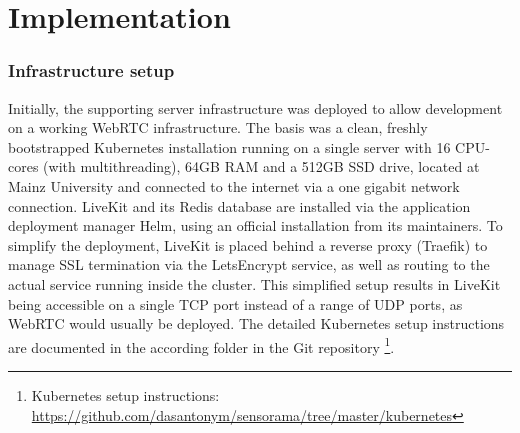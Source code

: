 \chapter{Implementation}

\subsection{Infrastructure setup}

Initially, the supporting server infrastructure was deployed to allow development on a working WebRTC infrastructure. The basis was a clean, freshly bootstrapped Kubernetes installation running on a single server with 16 CPU-cores (with multithreading), 64GB RAM and a 512GB SSD drive, located at Mainz University and connected to the internet via a one gigabit network connection. LiveKit and its Redis database are installed via the application deployment manager Helm, using an official installation from its maintainers. To simplify the deployment, LiveKit is placed behind a reverse proxy (Traefik) to manage SSL termination via the LetsEncrypt service, as well as routing to the actual service running inside the cluster. This simplified setup results in LiveKit being accessible on a single TCP port instead of a range of UDP ports, as WebRTC would usually be deployed. The detailed Kubernetes setup instructions are documented in the according folder in the Git repository \footnote{Kubernetes setup instructions: \href{https://github.com/dasantonym/sensorama/tree/master/kubernetes}{https://github.com/dasantonym/sensorama/tree/master/kubernetes}}.
